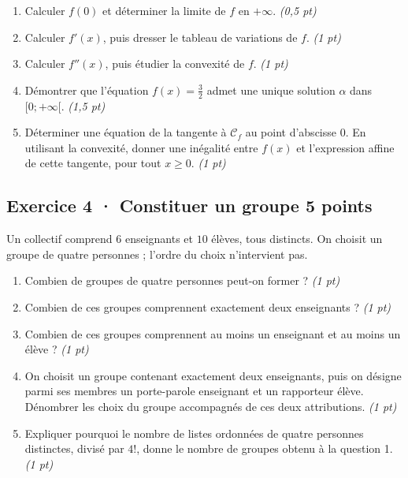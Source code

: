 \begin{enumerate}

\item Calculer $f(0)$ et déterminer la limite de $f$ en $+\infty$. \hfill\textit{(0,5 pt)}

\item Calculer $f' (x)$, puis dresser le tableau de variations de $f$. \hfill\textit{(1 pt)}

\item Calculer $f'' (x)$, puis étudier la convexité de $f$. \hfill\textit{(1 pt)}

\item Démontrer que l'équation $f(x)=\frac{3}{2}$ admet une unique solution $\alpha$ dans $[0;+\infty[$. \hfill\textit{(1,5 pt)}

\item Déterminer une équation de la tangente à $\mathcal C_f$ au point d'abscisse $0$. En utilisant la convexité, donner une inégalité entre $f(x)$ et l'expression affine de cette tangente, pour tout $x\ge0$. \hfill\textit{(1 pt)}

\end{enumerate}

\subsection*{Exercice 4 · Constituer un groupe \hfill 5 points}Un collectif comprend $6$ enseignants et $10$ élèves, tous distincts. On choisit un groupe de quatre personnes ; l'ordre du choix n'intervient pas.

\begin{enumerate}

\item Combien de groupes de quatre personnes peut-on former ? \hfill\textit{(1 pt)}

\item Combien de ces groupes comprennent exactement deux enseignants ? \hfill\textit{(1 pt)}

\item Combien de ces groupes comprennent au moins un enseignant et au moins un élève ? \hfill\textit{(1 pt)}

\item On choisit un groupe contenant exactement deux enseignants, puis on désigne parmi ses membres un porte-parole enseignant et un rapporteur élève. Dénombrer les choix du groupe accompagnés de ces deux attributions. \hfill\textit{(1 pt)}

\item Expliquer pourquoi le nombre de listes ordonnées de quatre personnes distinctes, divisé par $4!$, donne le nombre de groupes obtenu à la question 1. \hfill\textit{(1 pt)}

\end{enumerate}

